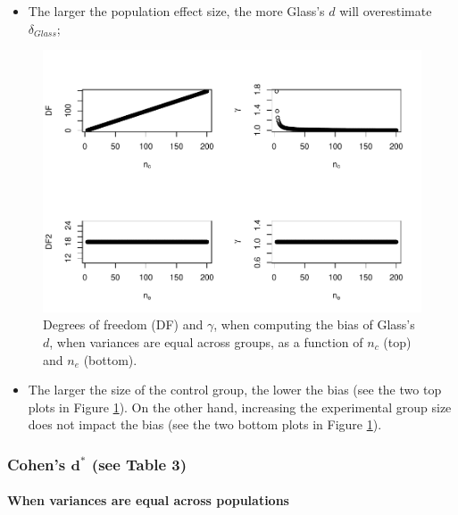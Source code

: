 \documentclass[
  english,
  man,mask]{apa6}
\providecommand{\tightlist}{%
  \setlength{\itemsep}{0pt}\setlength{\parskip}{0pt}}
\let\oldparagraph\paragraph
\renewcommand{\paragraph}[1]{\oldparagraph{#1}\mbox{}}
\begin{document}
\begin{itemize}
\tightlist
\item
  The larger the population effect size, the more Glass's \(d\) will overestimate \(\delta_{Glass}\);
\end{itemize}

\begin{figure}
\centering
\includegraphics{Theoretical-Bias-of-all-estimators-as-a-function-of-population-parameters_files/figure-latex/biasGlassctrlsize2-1.pdf}
\caption{\label{fig:biasGlassctrlsize2}Degrees of freedom (DF) and \(\gamma\), when computing the bias of Glass's \(d\), when variances are equal across groups, as a function of \(n_c\) (top) and \(n_e\) (bottom).}
\end{figure}

\begin{itemize}
\tightlist
\item
  The larger the size of the control group, the lower the bias (see the two top plots in Figure \ref{fig:biasGlassctrlsize2}). On the other hand, increasing the experimental group size does not impact the bias (see the two bottom plots in Figure \ref{fig:biasGlassctrlsize2}).
\end{itemize}

\hypertarget{cohens-bmd-see-table-3}{%
\subsubsection{\texorpdfstring{Cohen's \(\bm{d^*}\) (see Table 3)}{Cohen's \textbackslash bm\{d\^{}*\} (see Table 3)}}\label{cohens-bmd-see-table-3}}

\hypertarget{when-variances-are-equal-across-populations}{%
\paragraph{When variances are equal across populations}\label{when-variances-are-equal-across-populations}}
\end{document}

